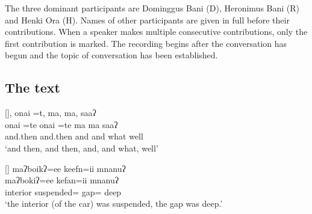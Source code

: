 The three dominant participants are Dominggus Bani
(D), Heronimus Bani (R) and Henki Ora (H).
Names of other participants
are given in full before their contributions.
When a speaker makes multiple consecutive contributions,
only the first contribution is marked.
The recording begins after the conversation has begun
and the topic of conversation has been established.

\newpage
\subsection{The text}
\begin{exe}
\renewcommand{\N}{\tsc{3gen}}

[]{, {onai =t}, ma, ma, saaʔ  \\
									{onai =te} {onai =te} ma ma saaʔ \\
									and.then and.then and and what well \\
						\glt	`and then, and then, and, and what, well'}

[]{\glll	{} maʔboikʔ=ee keefn=ii mnanuʔ \\
									 maʔbokiʔ=ee kefan=ii mnanuʔ \\
									interior suspended={\ee} gap={\ii} deep \\
						\glt	`the interior (of the car) was suspended, the gap was deep.'}

\end{exe}
